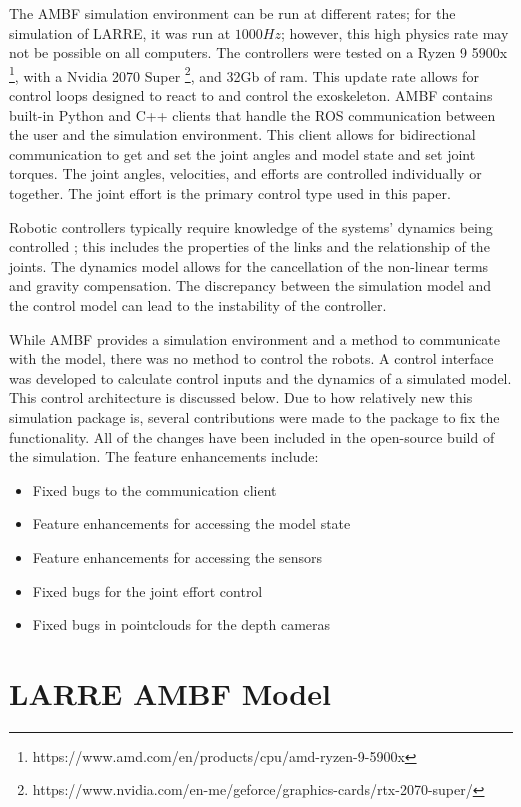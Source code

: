  
  The AMBF simulation environment can be run at different rates; for the simulation of LARRE, it was run at $1000Hz$; however, this high physics rate may not be possible on all computers. The controllers were tested on a Ryzen 9 5900x \footnote{https://www.amd.com/en/products/cpu/amd-ryzen-9-5900x}, with a Nvidia 2070 Super \footnote{https://www.nvidia.com/en-me/geforce/graphics-cards/rtx-2070-super/}, and 32Gb of ram. This update rate allows for control loops designed to react to and control the exoskeleton. AMBF contains built-in Python and C++ clients that handle the ROS communication between the user and the simulation environment. This client allows for bidirectional communication to get and set the joint angles and model state and set joint torques. The joint angles, velocities, and efforts are controlled individually or together. The joint effort is the primary control type used in this paper. 
 
Robotic controllers typically require knowledge of the systems' dynamics being controlled \cite{piltan2012design}; this includes the properties of the links and the relationship of the joints. The dynamics model allows for the cancellation of the non-linear terms and gravity compensation. The discrepancy between the simulation model and the control model can lead to the instability of the controller. 
 
 While AMBF provides a simulation environment and a method to communicate with the model, there was no method to control the robots. A control interface was developed to calculate control inputs and the dynamics of a simulated model. This control architecture is discussed below. Due to how relatively new this simulation package is, several contributions were made to the package to fix the functionality. All of the changes have been included in the open-source build of the simulation. The feature enhancements include:
 \begin{itemize}
     \item Fixed bugs to the communication client
     \item Feature enhancements for accessing the model state
     \item Feature enhancements for accessing the sensors 
     \item Fixed bugs for the joint effort control
     \item Fixed bugs in pointclouds for the depth cameras
 \end{itemize}
 
 \section{LARRE AMBF Model}
 
